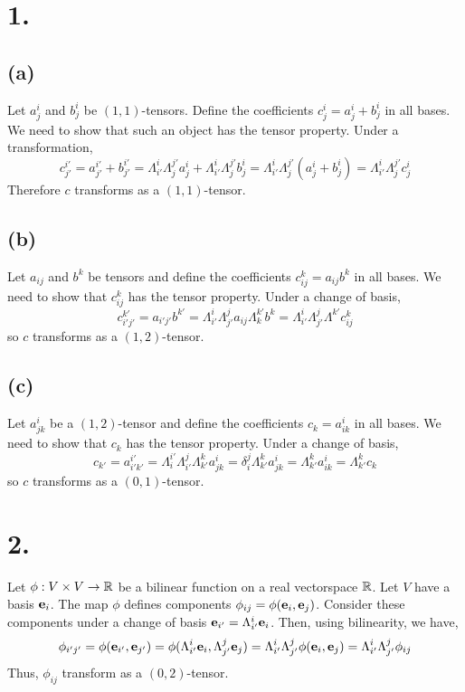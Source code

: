 \documentclass[12pt]{article}
\begin{document}

\section*{1.}

\subsection*{(a)}

Let $a^i_j$ and $b^i_j$ be $(1,1)$-tensors. Define the coefficients $c^i_j = a^i_j + b^i_j$ in all bases. We need to show that such an object has the tensor property. Under a transformation,
\[ c^{i'}_{j'} = a^{i'}_{j'} + b^{i'}_{j'} = \Lambda^i_{i'} \Lambda^{j'}_j a^i_j + \Lambda^i_{i'} \Lambda^{j'}_j b^i_j = \Lambda^i_{i'} \Lambda^{j'}_j (a^i_j + b^i_j) = \Lambda^i_{i'} \Lambda^{j'}_j c^i_j \]
Therefore $c$ transforms as a $(1,1)$-tensor.

\subsection*{(b)}

Let $a_{ij}$ and $b^k$ be tensors and define the coefficients $c^k_{ij} = a_{ij} b^k$ in all bases. We need to show that $c^k_{ij}$ has the tensor property. Under a change of basis,
\[ c^{k'}_{i'j'} = a_{i'j'} b^{k'} = \Lambda_{i'}^i \Lambda_{j'}^j a_{ij} \Lambda^{k'}_k b^k = \Lambda_{i'}^i \Lambda_{j'}^j  \Lambda^{k'} c^k_{ij} \]
so $c$ transforms as a $(1,2)$-tensor.

\subsection*{(c)}

Let $a^i_{jk}$ be a $(1, 2)$-tensor and define the coefficients $c_k = a^i_{ik}$ in all bases. We need to show that $c_k$ has the tensor property. Under a change of basis,
\[ c_{k'} = a^{i'}_{i'k'} = \Lambda^{i'}_i \Lambda_{i'}^j \Lambda_{k'}^k a^i_{jk} = \delta^j_i \Lambda_{k'}^k a^{i}_{jk} = \Lambda_{k'}^k a^i_{ik} = \Lambda_{k'}^k c_k \]
so $c$ transforms as a $(0,1)$-tensor.

\section*{2.}

Let $\phi : V \times V \to \R$ be a bilinear function on a real vectorspace $\R$. Let $V$ have a basis $\bf{e}_i$. The map $\phi$ defines components $\phi_{ij} = \phi(\bf{e}_i, \bf{e}_j)$. Consider these components under a change of basis $\bf{e}_{i'} = \Lambda^i_{i'} \bf{e}_i$. Then, using bilinearity, we have,
\[ \phi_{i'j'} = \phi(\bf{e}_{i'}, \bf{e}_{j'}) = \phi(\Lambda^i_{i'} \bf{e}_i, \Lambda^j_{j'} \bf{e}_j) = \Lambda^i_{i'} \Lambda^{j}_{j'} \phi(\bf{e}_i, \bf{e}_j) = \Lambda^i_{i'} \Lambda^{j}_{j'} \phi_{ij} \]
Thus, $\phi_{ij}$ transform as a $(0,2)$-tensor. 
\end{document}

